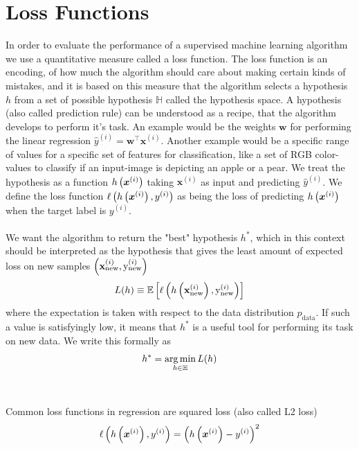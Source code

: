 \section{Loss Functions} \label{sec:loss_func}
In order to evaluate the performance of a supervised machine learning algorithm we use a quantitative measure called a loss function. The loss function is an encoding, of how much the algorithm should care about making certain kinds of mistakes, and it is based on this measure that the algorithm selects a hypothesis $h$ from a set of possible hypothesis $\mathbb{H}$ called the hypothesis space. A hypothesis (also called prediction rule) can be understood as a recipe, that the algorithm develops to perform it's task. An example would be the weights $\boldsymbol{w}$ for performing the linear regression $\hat{y}^{(i)} = \boldsymbol{w}^\top \boldsymbol{x}^{(i)}$. Another example would be a specific range of values for a specific set of features for classification, like a set of RGB color-values to classify if an input-image is depicting an apple or a pear. We treat the hypothesis as a function $h\left (\boldsymbol{x}^{(i)}\right)$ taking $\boldsymbol{x}^{(i)}$ as input and predicting $\hat{y}^{(i)}$. We define the loss function $\ell \left (h \left (\boldsymbol{x}^{(i)}\right), y^{(i)}\right)$ as being the loss of predicting $h \left (\boldsymbol{x}^{(i)}\right)$ when the target label is $y^{(i)}$.\\ 
\\
We want the algorithm to return the "best" hypothesis $h^*$, which in this context should be interpreted as the hypothesis that gives the least amount of expected loss on new samples $\left (\mathbf{x}^{(i)}_{\text{new}}, \text{y}^{(i)}_{\text{new}}\right)$
\begin{equation*}
    L(h) \equiv \E \lrs{\ell \lr{h \lr{\mathbf{x}_{\text{new}}^{(i)}}, \text{y}_{\text{new}}^{(i)}}}
\end{equation*}
where the expectation is taken with respect to the data distribution $p_{\text{data}}$. If such a value is satisfyingly low, it means that $h^*$ is a useful tool for performing its task on new data. We write this formally as
\begin{equation*}
   h^* = \operatorname*{arg\,min}_{h \in \mathbb{H}} L(h)
\end{equation*}
\\
\\
Common loss functions in regression are squared loss (also called L2 loss)
\begin{equation} \label{eq:mse}
    \ell\left(h\left (\boldsymbol{x}^{(i)}\right), y^{(i)} \right) = \left ( h\left (\boldsymbol{x}^{(i)}\right) - y^{(i)} \right)^2
\end{equation}

